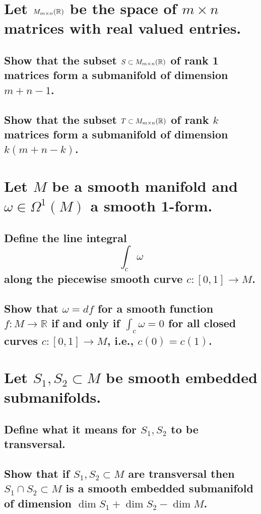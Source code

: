 \documentclass[10pt]{article}
\begin{document}
 

\section{Let $M_{ m \times n}(\mathbb{R}) $ be the space of $m \times n$ matrices with real
  valued entries.}

\subsection{Show that the subset $S \subset M_{m \times n}(\mathbb{R})$ of rank 1 matrices form a
  submanifold of dimension $m+n-1$.}

\subsection{Show that the subset $T \subset M_{m \times n}(\mathbb{R})$ of rank $k$ matrices form a
  submanifold of dimension $k(m+n-k)$.}

\section{Let $M$ be a smooth manifold and $\omega \in \Omega^1(M)$ a smooth 1-form.}

\subsection{Define the line integral
  $$\int_c \omega$$
  along the piecewise smooth curve $c: [0,1] \to M$.}

\subsection{Show that $\omega = df $ for a smooth function $f : M \to \mathbb{R}$ if and only if
  $\int_c \omega =0$ for all closed curves $c: [0,1] \to M$, i.e., $c(0) = c(1)$.}

\section{Let $S_1, S_2 \subset M$ be smooth embedded submanifolds.}

\subsection{Define what it means for $S_1, S_2$ to be transversal.}

\subsection{Show that if $S_1, S_2 \subset M$ are transversal then $S_1 \cap S_2 \subset M$ is a
  smooth embedded submanifold of dimension $\dim S_1 + \dim S_2 - \dim M$.}
\end{document}
